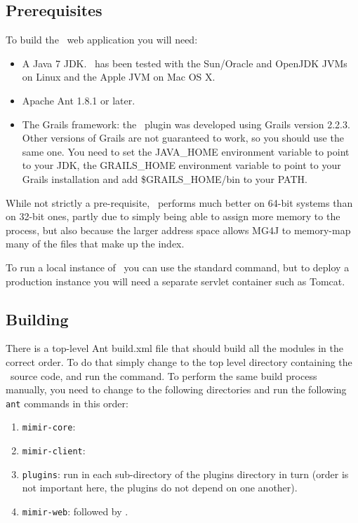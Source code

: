 \subsection{Prerequisites}

To build the \Mimir\ web application you will need:
\begin{itemize}
\item A Java 7 JDK.  \Mimir\ has been tested with the Sun/Oracle and OpenJDK
  JVMs on Linux and the Apple JVM on Mac OS X.
\item Apache Ant 1.8.1 or later.
\item The Grails framework:  the \Mimir\ plugin was developed using Grails
  version 2.2.3. Other versions of Grails are not guaranteed to work, so you
  should use the same one. You need to set the JAVA\_HOME environment variable
  to  point to your JDK, the GRAILS\_HOME environment variable to point to your
  Grails installation and add \$GRAILS\_HOME/bin to your PATH.
\end{itemize}

While not strictly a pre-requisite, \Mimir\ performs much better on 64-bit
systems than on 32-bit ones, partly due to simply being able to assign more
memory to the process, but also because the larger address space allows MG4J to
memory-map many of the files that make up the index.

To run a local instance of \Mimir\ you can use the standard  command, but to deploy a production instance you will need a separate
servlet container such as Tomcat.

\subsection{Building}

There is a top-level Ant build.xml file that should build all the modules in
the correct order. To do that simply change to the top level directory
containing the \Mimir\ source code, and run the  command. To perform
the same build process manually, you need to change to the following directories
and run the following {\tt ant} commands in this order:
\begin{enumerate}
\item {\tt mimir-core}: 
\item {\tt mimir-client}: 
\item {\tt plugins}: run  in each sub-directory of the plugins
  directory in turn (order is not important here, the plugins do not depend on
  one another).
\item {\tt mimir-web}:  followed by .
\end{enumerate}


